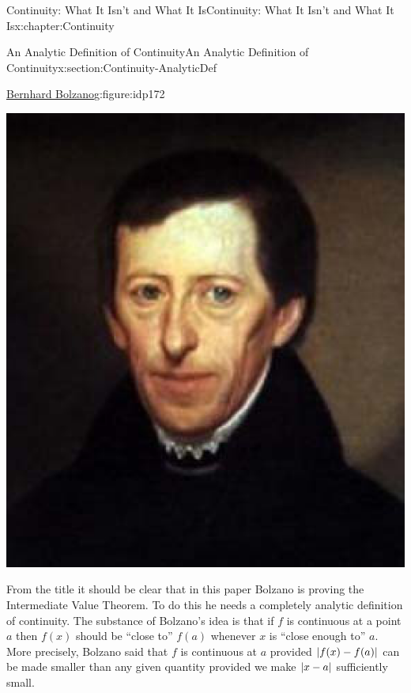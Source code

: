 \begin{chapterptx}{Continuity: What It Isn't and What It Is}{}{Continuity: What It Isn't and What It Is}{}{}{x:chapter:Continuity}
\begin{sectionptx}{An Analytic Definition of Continuity}{}{An Analytic Definition of Continuity}{}{}{x:section:Continuity-AnalyticDef}
\begin{figureptx}{\href{https://mathshistory.st-andrews.ac.uk/Biographies/Bolzano/}{Bernhard Bolzano}\protect\footnotemark{}}{g:figure:idp172}{}
\begin{image}{0.325}{0.35}{0.325}
				\includegraphics[width=\linewidth]{external/images/Bolzano.png}
			\end{image}%
			\tcblower
		\end{figureptx}%
		From the title it should be clear that in this paper Bolzano is proving the Intermediate Value Theorem.  To do this he needs a completely analytic definition of continuity.  The substance of Bolzano's idea is that if \(f\) is continuous at a point \(a\) then \(f(x)\) should be ``close to'' \(f(a)\) whenever \(x\) is ``close enough to'' \(a\).  More precisely, Bolzano said that \(f\) is continuous at \(a\) provided \(\left|f(x)-f(a)\right|\) can be made smaller than any given quantity provided we make \(\left|x-a\right|\) sufficiently small.%
		\par

\end{sectionptx}
\end{chapterptx}
